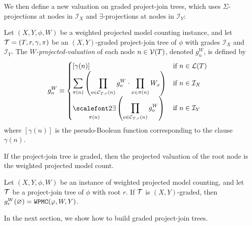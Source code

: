 We then define a new valuation on graded project-join trees, which uses $\Sigma$-projections at nodes in $\mathcal{I}_X$ and $\exists$-projections at nodes in $\mathcal{I}_Y$:
\begin{definition}
    \label{def:graded_valuation}
    Let $(X, Y, \phi, W)$ be a weighted projected model counting instance, and let $\mathcal{T} = (T, r, \gamma, \pi)$ be an $(X,Y)$-graded project-join tree of $\phi$ with grades $\mathcal{I}_X$ and $\mathcal{I}_Y$.
    The \emph{$W$-projected-valuation} of each node $n \in \mathcal{V}(T)$, denoted $g^W_n$, is defined by
    \begin{align*}
        g^W_n \equiv
        \begin{cases}
            [\gamma(n)] & \text{if } n \in \Lv{T} \\
            \displaystyle\sum_{\pi(n)} \pars{ \prod_{o \in \C T r n} g^W_o \cdot \prod_{x \in \pi(n)} W_x } & \text{if } n \in \mathcal{I}_X \\
            \displaystyle\exist_{\pi(n)} \pars{ \prod_{o \in \C T r n} g^W_o } & \text{if } n \in \mathcal{I}_Y
        \end{cases}
    \end{align*}
    where $[\gamma(n)]$ is the pseudo-Boolean function corresponding to the clause $\gamma(n)$.
\end{definition}

If the project-join tree is graded, then the projected valuation of the root node is the weighted projected model count.
\begin{theorem}
\label{thm:proj_valuation}
Let $(X, Y, \phi, W)$ be an instance of weighted projected model counting, and let $\mathcal{T}$ be a project-join tree of $\phi$ with root $r$. 
If $\mathcal{T}$ is $(X, Y)$-graded, then $g^W_r(\varnothing) = \texttt{\upshape WPMC}(\varphi, W, Y)$.
\end{theorem}

In the next section, we show how to build graded project-join trees.